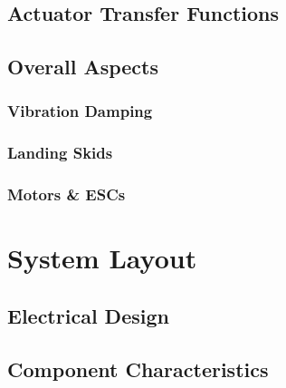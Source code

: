 \subsection{Actuator Transfer Functions}
\label{subsec:proto.design.transfer}

\subsection{Overall Aspects}
\label{subsec:proto.design.aspects}
\subsubsection{Vibration Damping}
\subsubsection{Landing Skids}
\subsubsection{Motors \& ESCs}

\section{System Layout}
\label{sec:proto.layout}
\subsection{Electrical Design}
\subsection{Component Characteristics}
